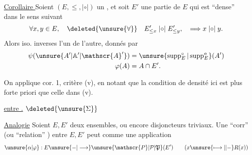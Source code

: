 
\uline{Corollaire } Soient $(E,\leq,\mathrel{|{\circ}|})$ un  , et soit $E'$ une partie de $E$ qui est ``dense'' dans le sens suivant
\[
\forall x,y\in E,\quad\deleted{\unsure{\forall}}\quad
E'_{\leq x}\mathrel{|{\circ}|}E'_{\leq y},\quad\Longrightarrow x\mathrel{|{\circ}|}y.
\]
Alors
iso. inverses l'un de l'autre, donnés par
\[
\begin{aligned}
\psi(\unsure{A'|\mathbb{A}'|\mathscr{A}'})&=\unsure{\operatorname{supp}^{\circ}_E|\operatorname{supp}^{o}_E}(A')\\
\varphi(A)&=A\cap E'.
\end{aligned}
\]

On applique cor. 1, critère (v), en notant que la condition de densité ici est plus forte  priori que celle dans (v).


 \uline{ entre  .} $\deleted{\unsure{\Sigma}}$

 \uline{Analogie} Soient $E,E'$ deux ensembles,  ou encore disjoncteurs triviaux. Une ``corr'' (ou ``relation'' ) entre $E,E'$ peut   comme une application
\[
\unsure{\alpha|\varphi}:E\unsure{{-}|\longrightarrow}\unsure{\mathscr{P}|\mathcal{P}|\mathfrak{P}}(E')
\qquad(x\unsure{\longmapsto|{\mid}{-}}R(x))
\]
